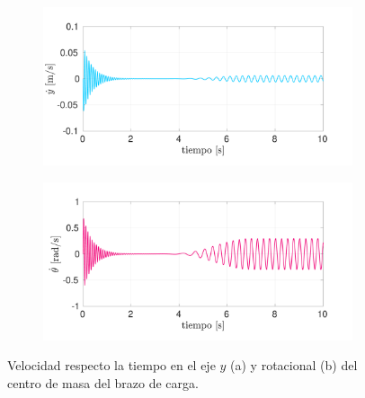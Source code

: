 \begin{figure}[p]
\centering
	\begin{subfigure}{1\linewidth}
		\centering
		\includegraphics[width=1\linewidth]{Imagenes/yp_2.pdf}
		\caption{}\label{fig:yp_2}
	\end{subfigure}
	\begin{subfigure}{1\linewidth}
		\centering
		\includegraphics[width=1\linewidth]{Imagenes/tp_2.pdf}
		\caption{}\label{fig:tp_2}
	\end{subfigure}
\par\bigskip
\caption{Velocidad respecto la tiempo en el eje $y$ (a) y rotacional (b) del centro de masa del brazo de carga.}
\label{fig:t_12}
\end{figure}

